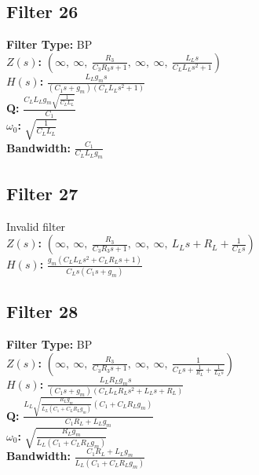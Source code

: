 \documentclass{article}
\begin{document}
\subsection*{Filter 26}
\textbf{Filter Type:} BP \\ 
\textbf{$Z(s)$:} $\left( \infty, \  \infty, \  \frac{R_{3}}{C_{3} R_{3} s + 1}, \  \infty, \  \infty, \  \frac{L_{L} s}{C_{L} L_{L} s^{2} + 1}\right)$ \\ 
\textbf{$H(s)$:} $\frac{L_{L} g_{m} s}{\left(C_{1} s + g_{m}\right) \left(C_{L} L_{L} s^{2} + 1\right)}$ \\ 
\textbf{Q:} $\frac{C_{L} L_{L} g_{m} \sqrt{\frac{1}{C_{L} L_{L}}}}{C_{1}}$ \\ 
\textbf{$\omega_0$:} $\sqrt{\frac{1}{C_{L} L_{L}}}$ \\ 
\textbf{Bandwidth:} $\frac{C_{1}}{C_{L} L_{L} g_{m}}$ \\ 
\subsection*{Filter 27}
Invalid filter \\ 
\textbf{$Z(s)$:} $\left( \infty, \  \infty, \  \frac{R_{3}}{C_{3} R_{3} s + 1}, \  \infty, \  \infty, \  L_{L} s + R_{L} + \frac{1}{C_{L} s}\right)$ \\ 
\textbf{$H(s)$:} $\frac{g_{m} \left(C_{L} L_{L} s^{2} + C_{L} R_{L} s + 1\right)}{C_{L} s \left(C_{1} s + g_{m}\right)}$ \\ 
\subsection*{Filter 28}
\textbf{Filter Type:} BP \\ 
\textbf{$Z(s)$:} $\left( \infty, \  \infty, \  \frac{R_{3}}{C_{3} R_{3} s + 1}, \  \infty, \  \infty, \  \frac{1}{C_{L} s + \frac{1}{R_{L}} + \frac{1}{L_{L} s}}\right)$ \\ 
\textbf{$H(s)$:} $\frac{L_{L} R_{L} g_{m} s}{\left(C_{1} s + g_{m}\right) \left(C_{L} L_{L} R_{L} s^{2} + L_{L} s + R_{L}\right)}$ \\ 
\textbf{Q:} $\frac{L_{L} \sqrt{\frac{R_{L} g_{m}}{L_{L} \left(C_{1} + C_{L} R_{L} g_{m}\right)}} \left(C_{1} + C_{L} R_{L} g_{m}\right)}{C_{1} R_{L} + L_{L} g_{m}}$ \\ 
\textbf{$\omega_0$:} $\sqrt{\frac{R_{L} g_{m}}{L_{L} \left(C_{1} + C_{L} R_{L} g_{m}\right)}}$ \\ 
\textbf{Bandwidth:} $\frac{C_{1} R_{L} + L_{L} g_{m}}{L_{L} \left(C_{1} + C_{L} R_{L} g_{m}\right)}$ \\ 
\end{document}
